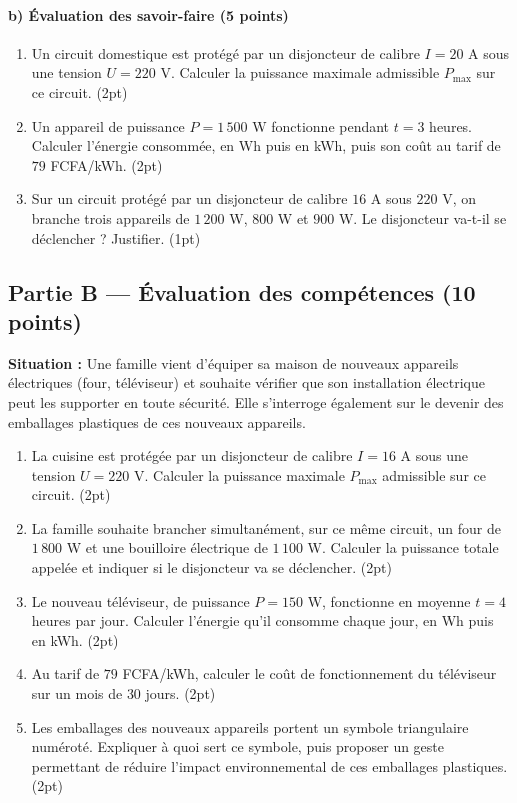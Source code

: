 \paragraph{b) Évaluation des savoir-faire (5 points)}
\begin{enumerate}[label=\arabic*)]
\item Un circuit domestique est protégé par un disjoncteur de calibre $I=20$ A sous une
tension $U=220$ V. Calculer la puissance maximale admissible $P_{\max}$ sur ce circuit.
\hfill (2pt)
\item Un appareil de puissance $P=1\,500$ W fonctionne pendant $t=3$ heures. Calculer
l'énergie consommée, en Wh puis en kWh, puis son coût au tarif de $79$ FCFA/kWh.
\hfill (2pt)
\item Sur un circuit protégé par un disjoncteur de calibre $16$ A sous $220$ V, on branche
trois appareils de $1\,200$ W, $800$ W et $900$ W. Le disjoncteur va-t-il se déclencher ?
Justifier. \hfill (1pt)
\end{enumerate}

\subsection*{Partie B — Évaluation des compétences (10 points)}

\noindent\textbf{Situation :} Une famille vient d'équiper sa maison de nouveaux appareils
électriques (four, téléviseur) et souhaite vérifier que son installation électrique peut
les supporter en toute sécurité. Elle s'interroge également sur le devenir des emballages
plastiques de ces nouveaux appareils.

\begin{enumerate}[label=\textbf{Tâche \arabic*.}, leftmargin=2.2cm]
\item La cuisine est protégée par un disjoncteur de calibre $I=16$ A sous une tension
$U=220$ V. Calculer la puissance maximale $P_{\max}$ admissible sur ce circuit.
\hfill (2pt)
\item La famille souhaite brancher simultanément, sur ce même circuit, un four de
$1\,800$ W et une bouilloire électrique de $1\,100$ W. Calculer la puissance totale
appelée et indiquer si le disjoncteur va se déclencher. \hfill (2pt)
\item Le nouveau téléviseur, de puissance $P=150$ W, fonctionne en moyenne $t=4$ heures
par jour. Calculer l'énergie qu'il consomme chaque jour, en Wh puis en kWh. \hfill (2pt)
\item Au tarif de $79$ FCFA/kWh, calculer le coût de fonctionnement du téléviseur sur un
mois de $30$ jours. \hfill (2pt)
\item Les emballages des nouveaux appareils portent un symbole triangulaire numéroté.
Expliquer à quoi sert ce symbole, puis proposer un geste permettant de réduire l'impact
environnemental de ces emballages plastiques. \hfill (2pt)
\end{enumerate}

